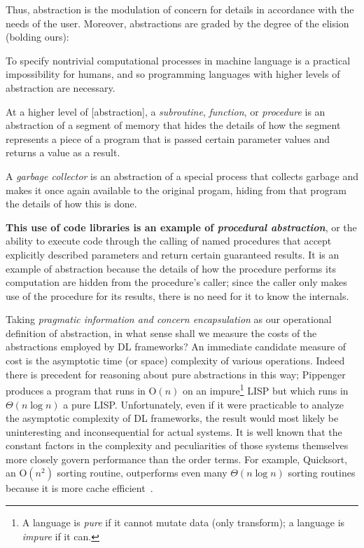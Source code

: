 Thus, abstraction is the modulation of concern for details in accordance with the needs of the user.
Moreover, abstractions are graded by the degree of the elision (bolding ours):
\begin{displayquote}
    To specify nontrivial computational processes in machine language is a practical impossibility for humans, and so programming languages with higher levels of abstraction are necessary.

    \vspace{4pt}

    \textellipsis At a higher level of [abstraction], a \textit{subroutine}, \textit{function}, or \textit{procedure} is an abstraction of a segment of memory that hides the details of how the segment represents a piece of a program that is passed certain parameter values and returns a value as a result.

    \vspace{4pt}

    \textellipsis A \textit{garbage collector} is an abstraction of a special process that collects garbage and makes it once again available to the original progam, hiding from that program the details of how this is done.


    \vspace{4pt}

    \textellipsis \textbf{This use of code libraries is an example of \textit{procedural abstraction}}, or the ability to execute code through the calling of named procedures that accept explicitly described parameters and return certain guaranteed results.
    It is an example of abstraction because the details of how the procedure performs its computation are hidden from the procedure's caller;
    since the caller only makes use of the procedure for its results, there is no need for it to know the internals.
\end{displayquote}


Taking \textit{pragmatic information and concern encapsulation} as our operational definition of abstraction, in what sense shall we measure the costs of the abstractions employed by DL frameworks?
An immediate candidate measure of cost is the asymptotic time (or space) complexity of various operations.
Indeed there is precedent for reasoning about pure abstractions in this way;
Pippenger~\cite{10.1145/244795.244798} produces a program that runs in O$(n)$ on an impure\footnote{A language is \textit{pure} if it cannot mutate data (only transform); a language is \textit{impure} if it can.} LISP but which runs in $\Theta(n \log n)$ a pure LISP\@.
Unfortunately, even if it were practicable to analyze the asymptotic complexity of DL frameworks, the result would most likely be uninteresting and inconsequential for actual systems.
It is well known that the constant factors in the complexity and peculiarities of those systems themselves more closely govern performance than the order terms.
For example, Quicksort, an O$\left(n^2\right)$ sorting routine, outperforms even many $\Theta(n\log n)$ sorting routines because it is more cache efficient~\cite{10.5555/1410219}.

